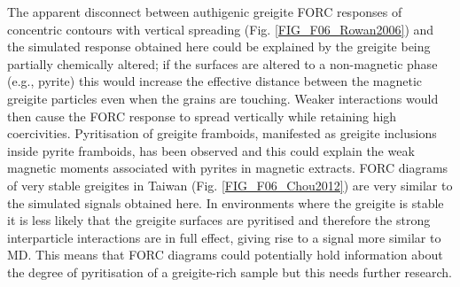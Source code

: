 The apparent disconnect between authigenic greigite FORC responses of concentric contours with vertical spreading (Fig. \ref{FIG_F06_Rowan2006}) and the simulated response obtained here could be explained by the greigite being partially chemically altered; if the surfaces are altered to a non-magnetic phase (e.g., pyrite) this would increase the effective distance between the magnetic greigite particles even when the grains are touching. Weaker interactions would then cause the FORC response to spread vertically while retaining high coercivities. Pyritisation of greigite framboids, manifested as greigite inclusions inside pyrite framboids, has been observed \citep{Ebert2018} and this could explain the weak magnetic moments associated with pyrites in magnetic extracts. FORC diagrams of very stable greigites in Taiwan (Fig. \ref{FIG_F06_Chou2012}) are very similar to the simulated signals obtained here. In environments where the greigite is stable it is less likely that the greigite surfaces are pyritised and therefore the strong interparticle interactions are in full effect, giving rise to a signal more similar to MD. This means that FORC diagrams could potentially hold information about the degree of pyritisation of a greigite-rich sample but this needs further research.

%
%
